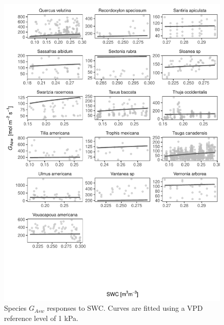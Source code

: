\documentclass[11pt,twoside]{reedthesis}
\begin{document}
\begin{figure}[H]

{\centering \includegraphics[width=1\linewidth]{figure/appendixD/ggg15} 

}

\caption{Species $G_{Asw}$ responses to SWC. Curves are fitted using a VPD reference level of 1 kPa.}\label{fig:unnamed-chunk-31}
\end{figure}
\end{document}
